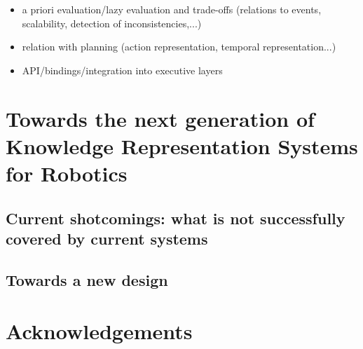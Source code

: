 \documentclass[a4paper, twocolumn]{article}
\begin{document}
\begin{itemize}
	\item a priori evaluation/lazy evaluation and trade-offs (relations to events, scalability, detection of inconsistencies,...)
	\item relation with planning (action representation, temporal representation...)
	\item API/bindings/integration into executive layers
\end{itemize}

\section{Towards the next generation of Knowledge Representation Systems for Robotics}
\label{sect|conclusion}

\subsection{Current shotcomings: what is not successfully covered by current systems}

\subsection{Towards a new design}

\section*{Acknowledgements} 




\end{document}
